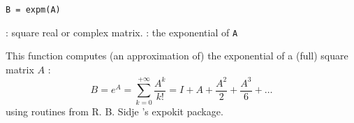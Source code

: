 

\begin{mandesc}
\end{mandesc}

\begin{calling_sequence}
\begin{verbatim}
B = expm(A)
\end{verbatim}
\end{calling_sequence}
\begin{parameters}
  \begin{varlist}
    :  square real or complex matrix.
    :  the exponential of \verb+A+
  \end{varlist}
\end{parameters}

\begin{mandescription}
This function computes (an approximation of) the exponential of a (full) square matrix $A$ :
$$
   B = e^A = \sum_{k=0}^{+\infty} \frac{A^k}{k !} = I + A + \frac{A^2}{2} + \frac{A^3}{6} + \dots
$$
using routines from R. B. Sidje 's expokit package.
\end{mandescription}

